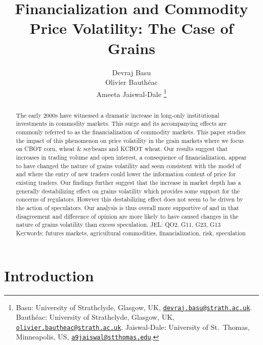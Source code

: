 \documentclass[12pt,]{article}
\title{Financialization and Commodity Price Volatility: The Case of Grains}
\author{ Devraj Basu  \\  Olivier Bauthéac  \\  Ameeta Jaiswal-Dale  
	  \thanks{ Basu: University of Strathclyde, Glasgow, UK, \href{mailto:devraj.basu@strath.ac.uk}{\nolinkurl{devraj.basu@strath.ac.uk}}.  Bauthéac: University of Strathclyde, Glasgow, UK, \href{mailto:olivier.bautheac@strath.ac.uk}{\nolinkurl{olivier.bautheac@strath.ac.uk}}.  Jaiswal-Dale: University of St.~Thomas, Minneapolis, US, \href{mailto:a9jaiswal@stthomas.edu}{\nolinkurl{a9jaiswal@stthomas.edu}}. 	  
	   }
  }
\date{}
\begin{document}
\maketitle
\begin{abstract}
The early 2000s have witnessed a dramatic increase in long-only
institutional investments in commodity markets. This surge and its
accompanying effects are commonly referred to as the financialization of
commodity markets. This paper studies the impact of this phenomenon on
price volatility in the grain markets where we focus on CBOT corn, wheat
\& soybeans and KCBOT wheat. Our results suggest that increases in
trading volume and open interest, a consequence of financialization,
appear to have changed the nature of grains volatility and seem
consistent with the model of \citet{stein_informational_1987} and
\citet{goldstein_information_2015} where the entry of new traders could
lower the information content of price for existing traders. Our
findings further suggest that the increase in market depth has a
generally destabilizing effect on grains volatility which provides some
support for the concerns of regulators. However this destabilizing
effect does not seem to be driven by the action of speculators. Our
analysis is thus overall more supportive of
\citet{singleton_investor_2013} and \citet{stein_informational_1987} in
that disagreement and difference of opinion are more likely to have
caused changes in the nature of grains volatility than excess
speculation. 
\newline
JEL: QO2, G11, G23, G13
\newline
Keywords: futures markets, agricultural commodities, financialization, risk,
speculation

\end{abstract}


\newpage

\hypertarget{introduction}{%
\section{Introduction}\label{introduction}}
\end{document}
